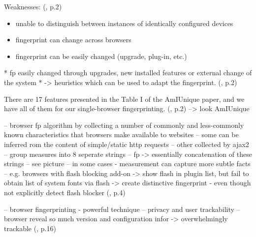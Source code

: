 Weaknesses: (\textcite{upi15}, p.2)
\begin{itemize}
	\item unable to distinguish between instances of identically configured devices
	\item fingerprint can change across browsers
	\item fingerprint can be easily changed (upgrade, plug-in, etc.)
\end{itemize}
* fp easily changed through upgrades, new installed features or external change of the system 
* -> heuristics which can be used to adapt the fingerprint.  (\textcite{upi15}, p.2)

There are 17 features presented in the Table I of the AmIUnique paper,
and we have all of them for our single-browser fingerprinting.
(\textcite{Cao17}, p.2)
--> look AmIUnique

-- browser fp algorithm  by collecting a number of commonly and less-commonly known characteristics that browsers make available to websites
-- some can be inferred rom the content of simple/static http requests
-- other collected by ajax2
-- group measures into 8 seperate strings
-- fp -> essentially concatenation of these strings
-- see picture
-- in some cases - measurement can capture more subtle facts
-- e.g. browsers with flash blocking add-on -> show flash in plugin list, but fail to obtain list of system fonts via flash -> create distinctive fingerprint - even though not explicitly detect flash blocker
(\textcite{eckersley10}, p.4)


-- browser fingerprinting - powerful technique
-- privacy and user trackability
-- browser reveal so much version and configuration infor -> overwhelmingly trackable
(\textcite{eckersley10}, p.16)

